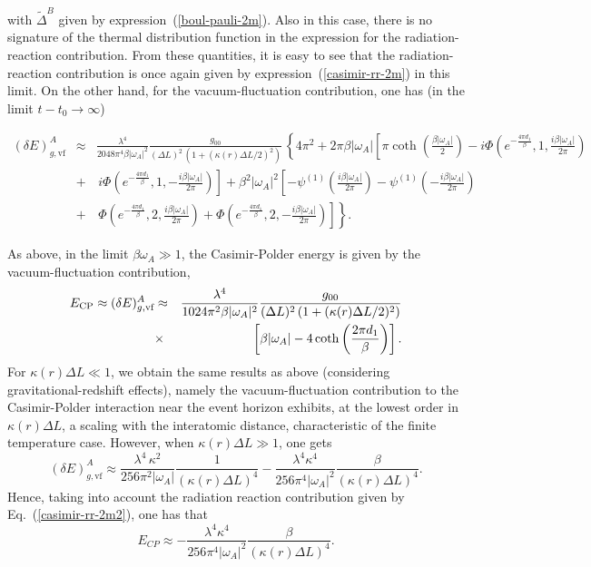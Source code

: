 \documentclass[twocolumn,prd,aps,showpacs,amsmath,amssymb]{revtex4-1}
\def\beq{\begin{equation}}
\def\eeq{\end{equation}}
\def\bea{\begin{eqnarray}}
\def\eea{\end{eqnarray}}
\def\nn{\nonumber}
\begin{document}
%
with $\tilde{\Delta}^{B}$ given by
expression~(\ref{boul-pauli-2m}). Also in this case, there is no
signature of the thermal distribution function in the expression for
the radiation-reaction contribution. From these quantities, it is easy
to see that the radiation-reaction contribution is once again given by
expression~(\ref{casimir-rr-2m}) in this limit. On the other hand, for
the vacuum-fluctuation contribution, one has (in the limit $t - t_0
\to \infty$) 
%
\begin{widetext}

\bea
(\delta E)^{A}_{g,\textrm{vf}} &\approx& \frac{\lambda^4}{2048\pi^4\beta|\omega _A|^2}
\frac{g_{00}}{(\Delta L)^2\,(1 + (\kappa(r) \Delta L/2)^2)}
\,\left\{4 \pi ^2 + 2 \pi  \beta  |\omega _A| \left[\pi  \coth \left(\frac{\beta  |\omega _A|}{2}\right)
- i \Phi \left(e^{-\frac{4 \pi d_1}{\beta }},1,\frac{i \beta  |\omega _A|}{2 \pi }\right) \right. \right.
\nn\\
&+&\, \left. \left. i \Phi \left(e^{-\frac{4 \pi  d_1}{\beta }},1,-\frac{i \beta  |\omega _A|}{2 \pi }\right)\right] 
+ \beta ^2 |\omega _A|^2 \left[-\psi ^{(1)}\left(\frac{i \beta  |\omega _A|}{2 \pi }\right)
-\psi ^{(1)}\left(-\frac{i \beta  |\omega _A|}{2 \pi }\right) \right. \right.
\nn\\
&+&\,\left. \left. \Phi \left(e^{-\frac{4 \pi d_1}{\beta }},2,\frac{i \beta  |\omega _A|}{2 \pi }\right)
+\Phi \left(e^{-\frac{4 \pi d_1}{\beta }},2,-\frac{i \beta  |\omega _A|}{2 \pi }\right)\right]\right\}.
\eea
%
\end{widetext}
As above, in the limit $\beta\omega_A \gg 1$, the Casimir-Polder energy is given by the vacuum-fluctuation contribution,
%
\bea
E_{\rm CP} \approx (\delta E)^{A}_{g,\textrm{vf}} &\approx& \frac{\lambda^4}{1024\pi^2\beta|\omega _A|^2}
\frac{g_{00}}{(\Delta L)^2\,(1 + (\kappa(r) \Delta L/2)^2)}
\nn\\
&\times&\,\left[\beta  |\omega _A| - 4 \coth \left(\frac{2 \pi  d_1}{\beta }\right)\right].
\eea
%
For $\kappa(r) \Delta L \ll 1$, we obtain the same results as above (considering gravitational-redshift effects), namely the vacuum-fluctuation contribution to the Casimir-Polder interaction near the event horizon exhibits, at the lowest order in $\kappa(r) \Delta L$, a scaling with the interatomic distance, characteristic of the finite temperature case. However, when $\kappa(r) \Delta L \gg 1$, one gets
%
\beq
(\delta E)^{A}_{g,\textrm{vf}} \approx \frac{\lambda^4\,\kappa^2}{256\pi^2 |\omega _A|}\frac{1}{(\kappa(r)\Delta L)^4}
-\frac{\lambda^4 \kappa^4}{256\pi^4|\omega _A|^2}\frac{\beta}{(\kappa(r)\Delta L)^4}.
\eeq
%
Hence, taking into account the radiation reaction contribution given
by Eq.~(\ref{casimir-rr-2m2}), one has that 
%
\beq\label{non-thermal}
E_{CP} \approx -\frac{\lambda^4 \kappa^4}{256\pi^4|\omega _A|^2}\frac{\beta}{(\kappa(r)\Delta L)^4}.
\eeq
%
\end{document}
